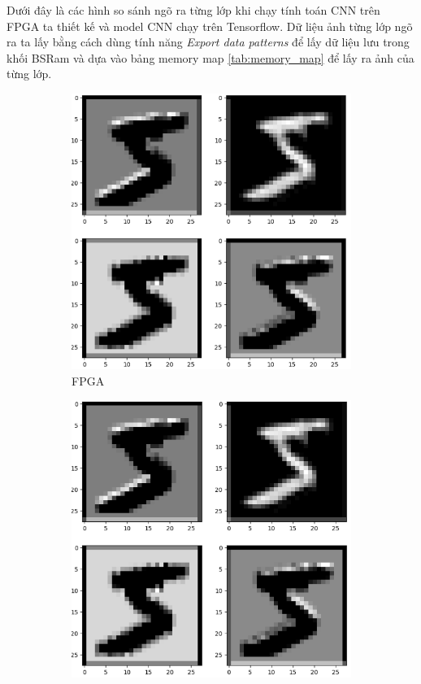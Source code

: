 Dưới đây là các hình so sánh ngõ ra từng lớp khi chạy tính toán CNN trên FPGA ta thiết kế và model CNN chạy trên Tensorflow. Dữ liệu ảnh từng lớp ngõ ra ta lấy bằng cách dùng tính năng \textit{Export data patterns} để lấy dữ liệu lưu trong khối BSRam và dựa vào bảng memory map \ref{tab:memory_map} để lấy ra ảnh của từng lớp.
\begin{figure}[H]
\centering
    \begin{subfigure}[b]{0.45\linewidth}
        \includegraphics[width=\linewidth]{Images/fpgac1.png}
        \caption{FPGA}
        \label{fig:enter-label}
    \end{subfigure}
    \begin{subfigure}[b]{0.45\linewidth}
        \includegraphics[width=\linewidth]{Images/cnnc1.png}

\end{subfigure}
\end{figure}
